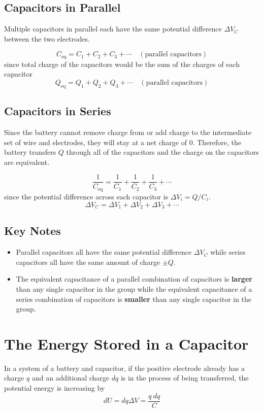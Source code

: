 \documentclass{article}
\begin{document}
\subsection*{Capacitors in Parallel}

Multiple capacitors in parallel each have the same potential difference $\Delta V_C$ between the
two electrodes.

\[C_\text{eq}=C_1 + C_2 + C_3 + \cdots\quad (\text{parallel capacitors})\]
since total charge of the capacitors would be the sum of the charges of each capacitor
\[Q_\text{eq}=Q_1 + Q_2 + Q_3 + \cdots\quad (\text{parallel capacitors})\]

\subsection*{Capacitors in Series}

Since the battery cannot remove charge from or add charge to the intermediate set of wire and
electrodes, they will stay at a net charge of 0. Therefore, the battery transfers $Q$ through all
of the capacitors and the charge on the capacitors are equivalent.

\[\frac{1}{C_\text{eq}}=\frac{1}{C_1} + \frac{1}{C_2} + \frac{1}{C_3} + \cdots\]
since the potential difference across each capacitor is $\Delta V_i = Q/C_i$.
\[\Delta V_C=\Delta V_1 + \Delta V_2 + \Delta V_3 + \cdots\]

\subsection*{Key Notes}
\begin{itemize}
    \item Parallel capacitors all have the same potential difference $\Delta V_C$ while series
    capacitors all have the same amount of charge $\pm Q$.
    \item The equivalent capacitance of a parallel combination of capacitors is \textbf{larger}
    than any single capacitor in the group while the equivalent capacitance of a series combination
    of capacitors is \textbf{smaller} than any single capacitor in the group.
\end{itemize}

\section*{The Energy Stored in a Capacitor}

In a system of a battery and capacitor, if the positive electrode already has a charge $q$ and an
additional charge $dq$ is in the process of being transferred, the potential energy is increasing
by
\[dU = dq\Delta V=\frac{q\: dq}{C}\]
\end{document}
